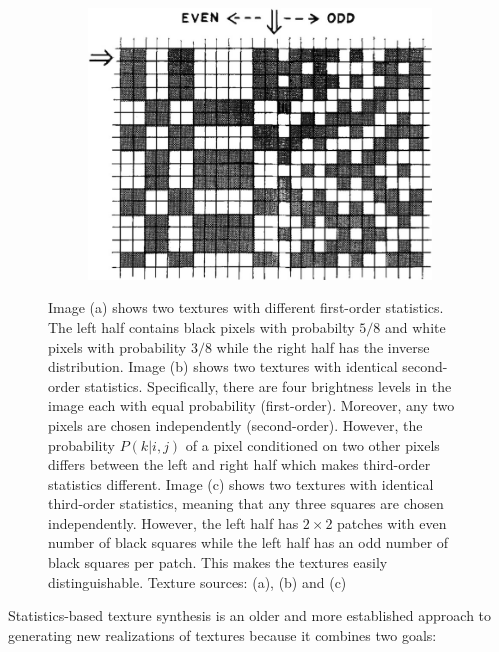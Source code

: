 \begin{figure}[ht]
\begin{subfigure}[b]{0.29\textwidth}
        \caption{}
    \end{subfigure}
    \hfill
    \begin{subfigure}[b]{0.39\textwidth}
        \centering
        \includegraphics[width=\textwidth]{images/02-julesz-3rd_order.jpg}
        \caption{}
    \end{subfigure}
    \caption{Image (a) shows two textures with different first-order statistics. The left half contains black pixels with probabilty \(5/8\) and white pixels with probability \(3/8\) while the right half has the inverse distribution. Image (b) shows two textures with identical second-order statistics. Specifically, there are four brightness levels in the image each with equal probability (first-order). Moreover, any two pixels are chosen independently (second-order). However, the probability \(P(k | i,j)\) of a pixel conditioned on two other pixels differs between the left and right half which makes third-order statistics different. Image (c) shows two textures with identical third-order statistics, meaning that any three squares are chosen independently. However, the left half has \(2 \times 2\) patches with even number of black squares while the left half has an odd number of black squares per patch. This makes the textures easily distinguishable. Texture sources: \citet{Julesz1962} (a), (b) and \citet{Julesz1973} (c)}
    \label{fig:background_julesz_textures}
\end{figure}

Statistics-based texture synthesis is an older and more established approach to generating new realizations of textures because it combines two goals:

